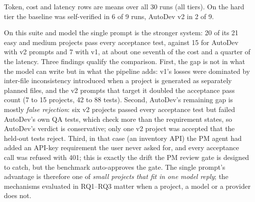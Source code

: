 \documentclass[conference,letterpaper]{IEEEtran}
\begin{document}
\begin{table}[t]
\caption{AutoDev vs.\ a Single-Prompt Baseline (DeepSeek V4.1 Flash; acceptance tests on the 21 easy and medium projects per system)}
\label{tab:baselines}
\centering
\footnotesize
\setlength{\tabcolsep}{3pt}
\vspace{2pt}
\parbox{\columnwidth}{\scriptsize Token, cost and latency rows are means over all 30 runs (all tiers).
On the hard tier the baseline was self-verified in 6 of 9 runs, AutoDev v2 in 2 of 9.}
\end{table}

On this suite and model the single prompt is the stronger system: 20 of its 21
easy and medium projects pass every acceptance test, against 15 for AutoDev with
v2 prompts and 7 with v1, at about one seventh of the cost and a quarter of the
latency. Three findings qualify the comparison. First, the gap is not in what
the model can write but in what the pipeline adds: v1's losses were dominated by
inter-file inconsistency introduced when a project is generated as separately
planned files, and the v2 prompts that target it doubled the acceptance pass
count (7 to 15 projects, 42 to 88 tests). Second, AutoDev's remaining gap is
mostly \emph{false rejection}: six v2 projects passed every acceptance test but
failed AutoDev's own QA tests, which check more than the requirement states, so
AutoDev's verdict is conservative; only one v2 project was accepted that the
held-out tests reject. Third, in that case (an inventory API) the PM agent had
added an API-key requirement the user never asked for, and every acceptance call
was refused with 401; this is exactly the drift the PM review gate is designed
to catch, but the benchmark auto-approves the gate. The single prompt's
advantage is therefore one of \emph{small projects that fit in one model reply};
the mechanisms evaluated in RQ1--RQ3 matter when a project, a model or a
provider does not.
\end{document}
